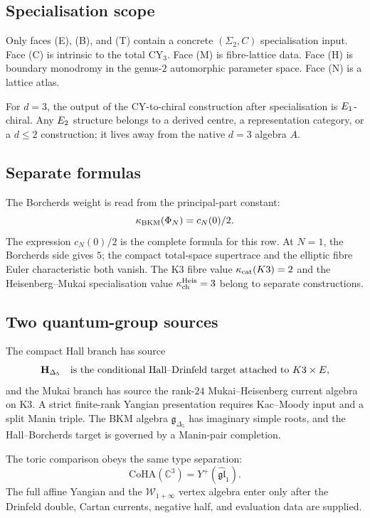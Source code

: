 \subsection{Specialisation scope}
\label{rcy:subsec:specialisation-scope}

Only faces (E), (B), and (T) contain a concrete
$(\Sigma_2,C)$ specialisation input.  Face (C) is intrinsic to the total
CY$_3$.  Face (M) is fibre-lattice data.  Face (H) is boundary
monodromy in the genus-$2$ automorphic parameter space.  Face (N) is a
lattice atlas.

For $d=3$, the output of the CY-to-chiral construction after
specialisation is $E_1$-chiral.  Any $E_2$ structure belongs to a
derived centre, a representation category, or a $d\leq2$ construction;
it lives away from the native $d=3$ algebra $A$.

\subsection{Separate formulas}
\label{rcy:subsec:separate-formulas}

The Borcherds weight is read from the principal-part constant:
\[
\kappa_{\mathrm{BKM}}(\Phi_N)=c_N(0)/2.
\]
The expression $c_N(0)/2$ is the complete formula for this row.  At
$N=1$, the Borcherds side gives $5$; the compact total-space
supertrace and the elliptic fibre Euler characteristic both vanish.
The K3 fibre value $\kappa_{\mathrm{cat}}(K3)=2$ and the Heisenberg--Mukai
specialisation value $\kappa_{\mathrm{ch}}^{\mathrm{Heis}}=3$ belong to separate
constructions.

\subsection{Two quantum-group sources}
\label{rcy:subsec:quantum-group-sources}

The compact Hall branch has source
\[
\mathbf H_{\Delta_5}\quad\hbox{is the conditional Hall--Drinfeld
target attached to }K3\times E,
\]
and the Mukai branch has source the rank-$24$ Mukai--Heisenberg current
algebra on K3.  A strict finite-rank Yangian presentation requires
Kac--Moody input and a split Manin triple.  The BKM algebra
$\mathfrak g_{\Delta_5}$ has imaginary simple roots, and the
Hall--Borcherds target is governed by a Manin-pair completion.

The toric comparison obeys the same type separation:
\[
\mathrm{CoHA}(\mathbb C^3)=Y^+(\widehat{\mathfrak{gl}}_1).
\]
The full affine Yangian and the $\mathcal W_{1+\infty}$ vertex
algebra enter only after the Drinfeld double, Cartan currents, negative
half, and evaluation data are supplied.

